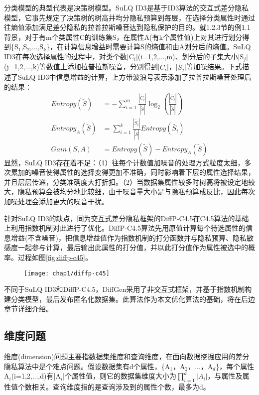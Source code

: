 分类模型的典型代表是决策树模型。SuLQ ID3\cite{SuLQ}是基于ID3算法的交互式差分隐私模型，它事先规定了决策树的树高并均分隐私预算到每层，在选择分类属性时通过往熵值添加满足差分隐私的拉普拉斯噪音达到隐私保护的目的。就1.2.3节的例1.1背景，对于有m个类属性C的训练集S，在属性A(有k个属性值)上对其进行划分得到\{S$_{1}$,S$_{2}$,...,S$_{k}$\}，在计算信息增益时需要计算S的熵值和由A划分后的熵值。SuLQ ID3在每次选择属性的过程中，对类个数|C$_{i}$|(i=1,2,...,m)、划分后的子集大小|S$_{j}$|(j=1,2,...,k)等数值上添加拉普拉斯噪音，分别得到|$\widetilde{C_{i}}$|，|$\widetilde{S_{j}}$|等加噪结果。下式描述了SuLQ ID3中信息增益的计算，上方带波浪号表示添加了拉普拉斯噪音处理后的结果：
\[
\begin{split}
	Entropy(\tilde{S}) &= -\sum_{i=1}^{m}\frac{|\widetilde{C_{i}}|}{|\widetilde{S}|}\log_{2}(\frac{|\widetilde{C_{i}}|}{|\widetilde{S}|})\\
	Entropy_{A}(\tilde{S}) &= \sum_{i=1}^{k}\frac{|\widetilde{S_{i}}|}{|\widetilde{S}|}Entropy(\tilde{S_{i}})\\
	Gain(S,A) &= Entropy(\tilde{S})-Entropy_{A}(\tilde{S})
\end{split}	
\]
显然，SuLQ ID3存在着不足：（1）往每个计数值加噪音的处理方式粒度太细，多次累加的噪音使得属性的选择变得更加不准确，同时影响着下层的属性选择结果，并且层层传递，分类准确度大打折扣。（2）当数据集属性较多时树高将被设定地较大，隐私预算会被均分地比较细，由于噪音量大小是与隐私预算成反比，因此每次加噪处理会添加更大的噪音干扰。

针对SuLQ ID3的缺点，同为交互式差分隐私框架的DiffP-C4.5\cite{diffp-c4.5}在C4.5算法的基础上利用指数机制对此进行了优化。DiffP-C4.5算法先用原值计算每个待选属性的信息增益(不含噪音)，把信息增益值作为指数机制的打分函数并与隐私预算、隐私敏感度一起参与计算，最后输出此属性的打分值，并以此打分值作为属性被选中的概率。过程如图\ref{fig:diffp-c45}。

\begin{figure}[!htp]
	\centering
	\texttt{[image: chap1/diffp-c45]}
\end{figure}

不同于SuLQ ID3和DiffP-C4.5，DiffGen\cite{DiffGen}采用了非交互式框架，并基于指数机制构建分类模型，最后发布匿名化数据集。此算法作为本文优化算法的基础，将在后边章节详细介绍。

\subsection{维度问题}
\label{sec:weidu}
维度(dimension)问题主要指数据集维度和查询维度，在面向数据挖掘应用的差分隐私算法中是个难点问题。假设数据集有d个属性，\{A$_{1}$，A$_{2}$，...，A$_{d}$\}，每个属性A$_{i}$(i=1,2,...,d)有|A$_{i}$|个属性值，则它的数据集维度大小为\(\prod\limits_{i = 1}^d {|A{_i} |}\)，与属性及属性值个数相关。查询维度指的是查询涉及到的属性个数，最多为d。

